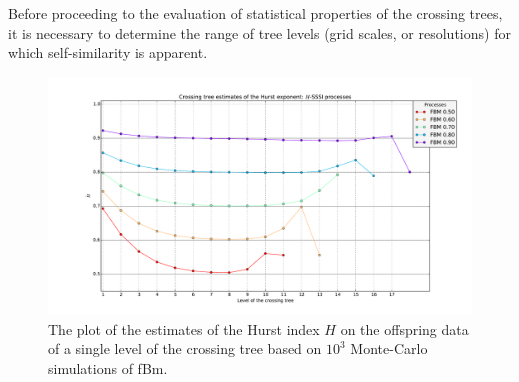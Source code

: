 \documentclass[a4paper]{article}
\begin{document}
Before proceeding to the evaluation of statistical properties of the crossing trees,
it is necessary to determine the range of tree levels (grid scales, or resolutions)
for which self-similarity is apparent.
\begin{figure}[htb]\begin{center}
    \includegraphics[width=6in]{images/fbm_fig_05_med_1000-21}
    \caption{The plot of the estimates of the Hurst index $H$ on the offspring data
    of a single level of the crossing tree based on $10^3$ Monte-Carlo simulations of
    fBm.}
\label{fig:fbm_hurst_crossing_tree}
\end{center}\end{figure}
\end{document}
